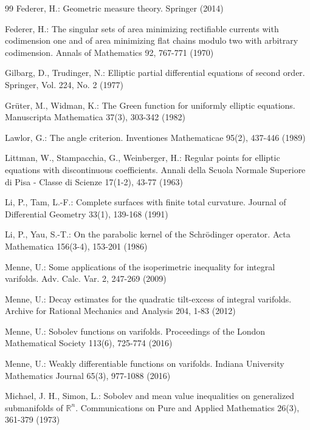 \documentclass[11pt]{amsart}
\theoremstyle{definition}
\begin{document}
\begin{thebibliography}{99}
	Federer, H.: Geometric measure theory.  
	Springer (2014)
	
	Federer, H.: The singular sets of area minimizing rectifiable currents with codimension one and of area minimizing flat chains modulo two with arbitrary codimension.  
	Annals of Mathematics 92, 767-771 (1970)
	
	Gilbarg, D., Trudinger, N.: Elliptic partial differential equations of second order.  
	Springer, Vol. 224, No. 2 (1977)
	
	Gr\"uter, M., Widman, K.: The Green function for uniformly elliptic equations.  
	Manuscripta Mathematica 37(3), 303-342 (1982)
	
	Lawlor, G.: The angle criterion.  
	Inventiones Mathematicae 95(2), 437-446 (1989)

    
	Littman, W., Stampacchia, G., Weinberger, H.: Regular points for elliptic equations with discontinuous coefficients.  
	Annali della Scuola Normale Superiore di Pisa - Classe di Scienze 17(1-2), 43-77 (1963)
	
	Li, P., Tam, L.-F.: Complete surfaces with finite total curvature.  
	Journal of Differential Geometry 33(1), 139-168 (1991)
	
	Li, P., Yau, S.-T.: On the parabolic kernel of the Schr\"odinger operator.  
	Acta Mathematica 156(3-4), 153-201 (1986)
	
    Menne, U.: Some applications of the isoperimetric inequality for integral varifolds. Adv. Calc. Var. 2, 247-269 (2009)
	
	Menne, U.: Decay estimates for the quadratic tilt-excess of integral varifolds.  
	Archive for Rational Mechanics and Analysis 204, 1-83 (2012)
	
	Menne, U.: Sobolev functions on varifolds.  
	Proceedings of the London Mathematical Society 113(6), 725-774 (2016)
	
	Menne, U.: Weakly differentiable functions on varifolds.  
	Indiana University Mathematics Journal 65(3), 977-1088 (2016)
	
	Michael, J. H., Simon, L.: Sobolev and mean value inequalities on generalized submanifolds of $\mathbb{R}^n$.  
	Communications on Pure and Applied Mathematics 26(3), 361-379 (1973)
	

\end{thebibliography}
\end{document}
